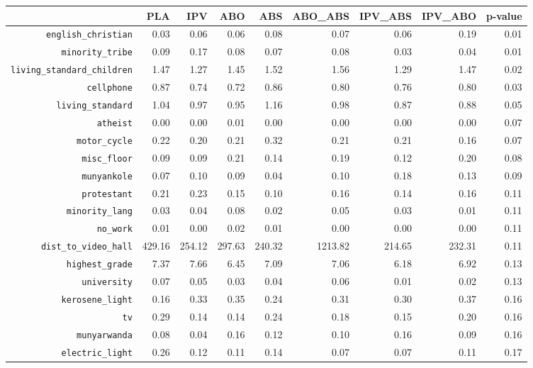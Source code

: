 \begin{longtable}{rrrrrrrrr}
  \hline
 & PLA & IPV & ABO & ABS & ABO\_ABS & IPV\_ABS & IPV\_ABO & p-value \\ 
  \hline
{\texttt{english\_christian}} & 0.03 & 0.06 & 0.06 & 0.08 & 0.07 & 0.06 & 0.19 & 0.01 \\ 
  {\texttt{minority\_tribe}} & 0.09 & 0.17 & 0.08 & 0.07 & 0.08 & 0.03 & 0.04 & 0.01 \\ 
  {\texttt{living\_standard\_children}} & 1.47 & 1.27 & 1.45 & 1.52 & 1.56 & 1.29 & 1.47 & 0.02 \\ 
  {\texttt{cellphone}} & 0.87 & 0.74 & 0.72 & 0.86 & 0.80 & 0.76 & 0.80 & 0.03 \\ 
  {\texttt{living\_standard}} & 1.04 & 0.97 & 0.95 & 1.16 & 0.98 & 0.87 & 0.88 & 0.05 \\ 
  {\texttt{atheist}} & 0.00 & 0.00 & 0.01 & 0.00 & 0.00 & 0.00 & 0.00 & 0.07 \\ 
  {\texttt{motor\_cycle}} & 0.22 & 0.20 & 0.21 & 0.32 & 0.21 & 0.21 & 0.16 & 0.07 \\ 
  {\texttt{misc\_floor}} & 0.09 & 0.09 & 0.21 & 0.14 & 0.19 & 0.12 & 0.20 & 0.08 \\ 
  {\texttt{munyankole}} & 0.07 & 0.10 & 0.09 & 0.04 & 0.10 & 0.18 & 0.13 & 0.09 \\ 
  {\texttt{protestant}} & 0.21 & 0.23 & 0.15 & 0.10 & 0.16 & 0.14 & 0.16 & 0.11 \\ 
  {\texttt{minority\_lang}} & 0.03 & 0.04 & 0.08 & 0.02 & 0.05 & 0.03 & 0.01 & 0.11 \\ 
  {\texttt{no\_work}} & 0.01 & 0.00 & 0.02 & 0.01 & 0.00 & 0.00 & 0.00 & 0.11 \\ 
  {\texttt{dist\_to\_video\_hall}} & 429.16 & 254.12 & 297.63 & 240.32 & 1213.82 & 214.65 & 232.31 & 0.11 \\ 
  {\texttt{highest\_grade}} & 7.37 & 7.66 & 6.45 & 7.09 & 7.06 & 6.18 & 6.92 & 0.13 \\ 
  {\texttt{university}} & 0.07 & 0.05 & 0.03 & 0.04 & 0.06 & 0.01 & 0.02 & 0.13 \\ 
  {\texttt{kerosene\_light}} & 0.16 & 0.33 & 0.35 & 0.24 & 0.31 & 0.30 & 0.37 & 0.16 \\ 
  {\texttt{tv}} & 0.29 & 0.14 & 0.14 & 0.24 & 0.18 & 0.15 & 0.20 & 0.16 \\ 
  {\texttt{munyarwanda}} & 0.08 & 0.04 & 0.16 & 0.12 & 0.10 & 0.16 & 0.09 & 0.16 \\ 
  {\texttt{electric\_light}} & 0.26 & 0.12 & 0.11 & 0.14 & 0.07 & 0.07 & 0.11 & 0.17 \\ 

\end{longtable}
